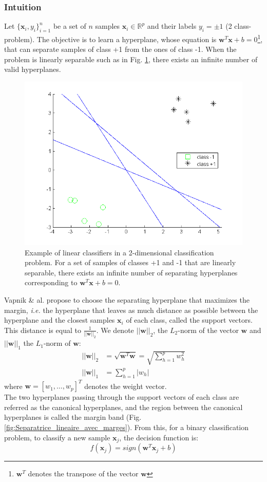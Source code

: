 \subsubsection{Intuition}
Let $\{\textbf{x}_i,y_i\}_{i=1}^n$ be a set of $n$ samples $\textbf{x}_i \in \mathbb{R}^p$ and their labels $y_i= \pm 1$ (2 class-problem). The objective is to learn a hyperplane, whose equation is $\textbf{w}^T \textbf{x} + b = 0$\footnote{$\textbf{w}^T$ denotes the transpose of the vector $\textbf{w}$}, that can separate samples of class +1 from the ones of class -1. When the problem is linearly separable such as in Fig. \ref{fig:Plusieurs_separatrice_lineaire}, there exists an infinite number of valid hyperplanes. 

\begin{figure}[h!]
\centering
\includegraphics[width=0.5\linewidth]{images/Plusieurs_separatrice_lineaire2}
\caption{Example of linear classifiers in a 2-dimensional classification problem. For a set of samples of classes +1 and -1 that are linearly separable, there exists an infinite number of separating hyperplanes corresponding to $\textbf{w}^T\textbf{x} + b = 0.$ }
\label{fig:Plusieurs_separatrice_lineaire}
\end{figure}

\noindent Vapnik \& al. \cite{Cortes1995} propose to choose the separating hyperplane that maximizes the margin, \textit{i.e.} the hyperplane that leaves as much distance as possible between the hyperplane and the closest samples $\textbf{x}_i$ of each class, called the support vectors. This distance is equal to $\frac{1}{||\textbf{w}||_2}$. We denote $||\textbf{w}||_2$, the $L_2$-norm of the vector $\textbf{w}$ and $||\textbf{w}||_1$ the $L_1$-norm of $\textbf{w}$:
\begin{align}
	||\textbf{w}||_2 & = \sqrt{\textbf{w}^T \textbf{w}} = \sqrt{\sum\limits_{h=1}^{p} w_h^2}\\
	||\textbf{w}||_1 & = \sum\limits_{h=1}^{p} |w_h|
\end{align}
\noindent where $\textbf{w} = [w_1, \ldots, w_p]^T$ denotes the weight vector. \\
The two hyperplanes passing through the support vectors of each class are referred as the canonical hyperplanes, and the region between the canonical hyperplanes is called the margin band (Fig. \ref{fig:Separatrice_lineaire_avec_marges}). From this, for a binary classification problem, to classify a new sample $\textbf{x}_j$, the decision function is:
\begin{equation}
f(\textbf{x}_j) = sign(\textbf{w}^T \textbf{x}_j + b) \label{eq:decision_function}
\end{equation}

